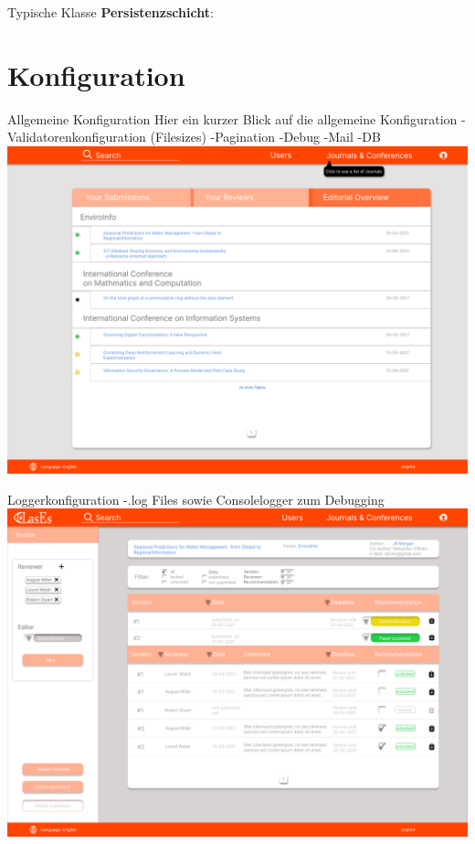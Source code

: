 \documentclass{beamer}
\begin{document}
\begin{frame}{Typische Klasse \textbf{Persistenzschicht}:}
        \section{Konfiguration}
        \begin{frame}{Allgemeine Konfiguration}
            Hier ein kurzer Blick auf die allgemeine Konfiguration
            -Validatorenkonfiguration (Filesizes)
            -Pagination
            -Debug
            -Mail
            -DB
            \centering
            \includegraphics[height=0.75\textheight]{../../docs/Pflichtenheft/graphics/Homepage-png}
        \end{frame}

        \begin{frame}{Loggerkonfiguration}
            -.log Files sowie Consolelogger zum Debugging
            \centering
            \includegraphics[height=0.75\textheight]{../../docs/Pflichtenheft/graphics/Submission-png}
        \end{frame}



\end{frame}
\end{document}
